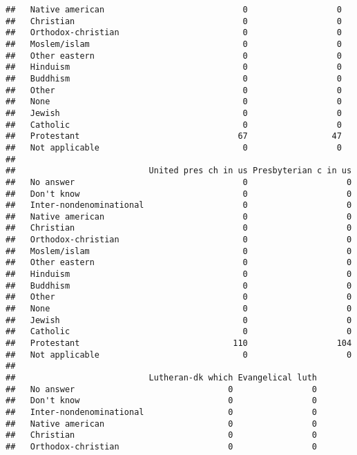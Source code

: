 \documentclass[]{article}
\theoremstyle{definition}
\theoremstyle{definition}
\theoremstyle{definition}
\theoremstyle{remark}
\begin{document}
\begin{verbatim}
##   Native american                            0                  0
##   Christian                                  0                  0
##   Orthodox-christian                         0                  0
##   Moslem/islam                               0                  0
##   Other eastern                              0                  0
##   Hinduism                                   0                  0
##   Buddhism                                   0                  0
##   Other                                      0                  0
##   None                                       0                  0
##   Jewish                                     0                  0
##   Catholic                                   0                  0
##   Protestant                                67                 47
##   Not applicable                             0                  0
##                          
##                           United pres ch in us Presbyterian c in us
##   No answer                                  0                    0
##   Don't know                                 0                    0
##   Inter-nondenominational                    0                    0
##   Native american                            0                    0
##   Christian                                  0                    0
##   Orthodox-christian                         0                    0
##   Moslem/islam                               0                    0
##   Other eastern                              0                    0
##   Hinduism                                   0                    0
##   Buddhism                                   0                    0
##   Other                                      0                    0
##   None                                       0                    0
##   Jewish                                     0                    0
##   Catholic                                   0                    0
##   Protestant                               110                  104
##   Not applicable                             0                    0
##                          
##                           Lutheran-dk which Evangelical luth
##   No answer                               0                0
##   Don't know                              0                0
##   Inter-nondenominational                 0                0
##   Native american                         0                0
##   Christian                               0                0
##   Orthodox-christian                      0                0

\end{verbatim}
\end{document}
